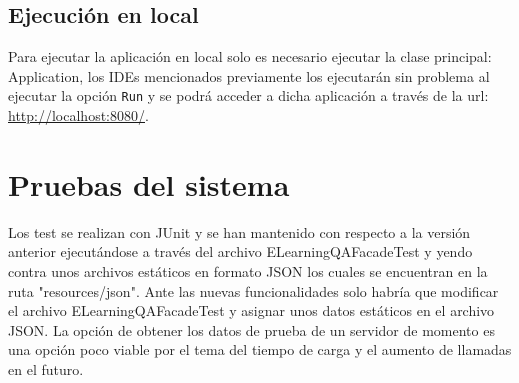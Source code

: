 \subsection{Ejecución en local}
Para ejecutar la aplicación en local solo es necesario ejecutar la clase principal: Application, los IDEs mencionados previamente los ejecutarán sin problema al ejecutar la opción \texttt{Run} y se podrá acceder a dicha aplicación a través de la url: \url{http://localhost:8080/}.

\section{Pruebas del sistema}
Los test se realizan con JUnit y se han mantenido con respecto a la versión anterior ejecutándose a través del archivo ELearningQAFacadeTest y yendo contra unos archivos estáticos en formato JSON los cuales se encuentran en la ruta "resources/json". Ante las nuevas funcionalidades solo habría que modificar el archivo ELearningQAFacadeTest y asignar unos datos estáticos en el archivo JSON. La opción de obtener los datos de prueba de un servidor de momento es una opción poco viable por el tema del tiempo de carga y el aumento de llamadas en el futuro.